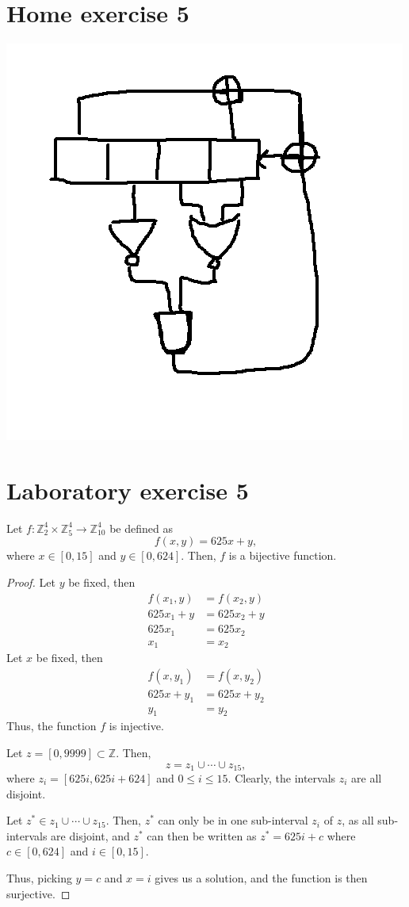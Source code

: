 \documentclass{article}
\theoremstyle{definition}
\theoremstyle{definition}
\theoremstyle{definition}
\begin{document}
\section{Home exercise 5}
\includegraphics[scale=0.8]{gates.png}

\section{Laboratory exercise 5}
Let $f: \mathbb{Z}_2^4 \times \mathbb{Z}_5^4 \rightarrow \mathbb{Z}_{10}^4$ be defined as $$f(x, y) = 625x + y,$$
where $x\in [0, 15]$ and $y\in [0, 624]$. Then, $f$ is a bijective function.

\begin{proof}
Let $y$ be fixed, then
\begin{align*}
f(x_1, y) &= f(x_2, y) \\
625x_1 + y &= 625x_2 + y \\
625x_1 &= 625x_2 \\
x_1 &= x_2
\end{align*}
Let $x$ be fixed, then
\begin{align*}
f(x, y_1) &= f(x, y_2) \\
625x + y_1 &= 625x + y_2 \\
y_1 &= y_2
\end{align*}
Thus, the function $f$ is injective.

Let $z = [0, 9999] \subset \mathbb{Z}$.
Then, $$z = z_1 \cup \cdots \cup z_{15},$$ where $z_i = [625i, 625i + 624]$ and $0 \leq i \leq 15$. Clearly, the intervals $z_i$ are all disjoint.

Let $z^* \in z_1 \cup \cdots \cup z_{15}$. Then, $z^*$ can only be in one sub-interval $z_i$ of $z$, as all sub-intervals are disjoint, and $z^*$ can then be written as $z^* = 625i + c$ where $c \in [0, 624]$ and $i\in [0, 15]$.

Thus, picking $y = c$ and $x = i$ gives us a solution, and the function is then surjective.
\end{proof}
\end{document}
